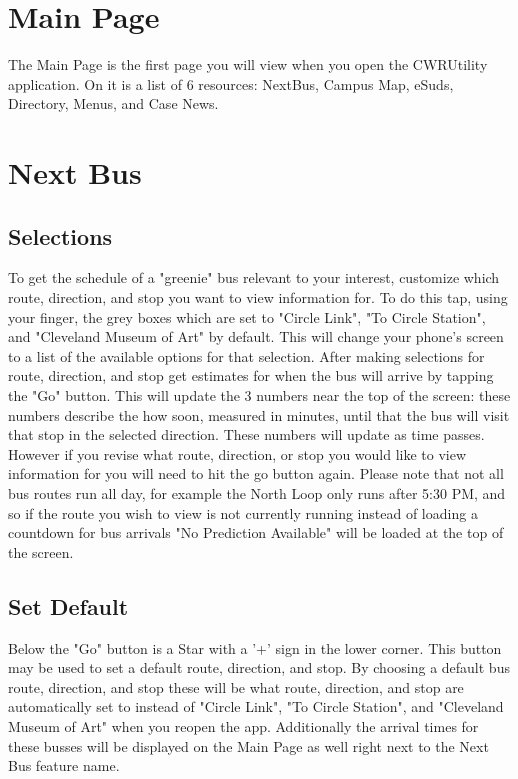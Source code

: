 \documentclass[pdftex,12pt,letter]{article}
\begin{document}
\section{Main Page}
The Main Page is the first page you will view when you open the CWRUtility application. On it is a list of 6 resources: NextBus, Campus Map, eSuds, Directory, Menus, and Case News. 

\section{Next Bus}
\subsection{Selections}
To get the schedule of a "greenie" bus relevant to your interest, customize which route, direction, and stop you want to view information for. To do this tap, using your finger, the grey boxes which are set to "Circle Link", "To Circle Station", and "Cleveland Museum of Art" by default. This will change your phone's screen to a list of the available options for that selection. After making selections for route, direction, and stop get estimates for when the bus will arrive by tapping the "Go" button. This will update the 3 numbers near the top of the screen: these numbers describe the how soon, measured in minutes, until that the bus will visit that stop in the selected direction. These numbers will update as time passes. However if you revise what route, direction, or stop you would like to view information for you will need to hit the go button again. Please note that not all bus routes run all day, for example the North Loop only runs after 5:30 PM, and so if the route you wish to view is not currently running instead of loading a countdown for bus arrivals "No Prediction Available" will be loaded at the top of the screen. 
\subsection{Set Default}
Below the "Go" button is a Star with a '+' sign in the lower corner. This button may be used to set a default route, direction, and stop. By choosing a default bus route, direction, and stop these will be what route, direction, and stop are automatically set to instead of  "Circle Link", "To Circle Station", and "Cleveland Museum of Art" when you reopen the app. Additionally the arrival times for these busses will be displayed on the Main Page as well right next to the Next Bus feature name.
\end{document}
